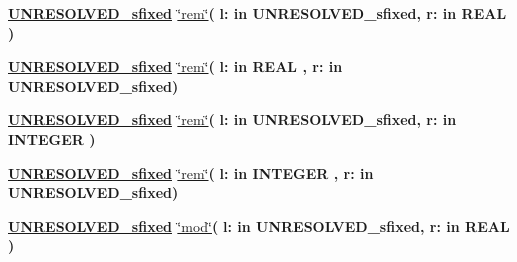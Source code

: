\begin{DoxyCompactItemize}
\item 
{\bfseries {\bfseries {\bfseries \hyperlink{classfixed__pkg_aa723b28a027c3c0f9bca02d75e8df4d6}{U\+N\+R\+E\+S\+O\+L\+V\+E\+D\+\_\+sfixed}} \textcolor{vhdlchar}{ }}} \hyperlink{classfixed__pkg_ac069740ccb193c395e563f253d734127}{\char`\"{}rem\char`\"{}}{\bfseries  ( }{\bfseries \textcolor{vhdlchar}{l\+: }\textcolor{stringliteral}{in }\textcolor{vhdlchar}{U\+N\+R\+E\+S\+O\+L\+V\+E\+D\+\_\+sfixed}}{\bfseries  , \textcolor{vhdlchar}{r\+: }\textcolor{stringliteral}{in }{\bfseries \textcolor{comment}{R\+E\+A\+L}\textcolor{vhdlchar}{ }}}{\bfseries  )} 
\item 
{\bfseries {\bfseries {\bfseries \hyperlink{classfixed__pkg_aa723b28a027c3c0f9bca02d75e8df4d6}{U\+N\+R\+E\+S\+O\+L\+V\+E\+D\+\_\+sfixed}} \textcolor{vhdlchar}{ }}} \hyperlink{classfixed__pkg_ac069740ccb193c395e563f253d734127}{\char`\"{}rem\char`\"{}}{\bfseries  ( }{\bfseries \textcolor{vhdlchar}{l\+: }\textcolor{stringliteral}{in }{\bfseries \textcolor{comment}{R\+E\+A\+L}\textcolor{vhdlchar}{ }}}{\bfseries  , \textcolor{vhdlchar}{r\+: }\textcolor{stringliteral}{in }\textcolor{vhdlchar}{U\+N\+R\+E\+S\+O\+L\+V\+E\+D\+\_\+sfixed}}{\bfseries  )} 
\item 
{\bfseries {\bfseries {\bfseries \hyperlink{classfixed__pkg_aa723b28a027c3c0f9bca02d75e8df4d6}{U\+N\+R\+E\+S\+O\+L\+V\+E\+D\+\_\+sfixed}} \textcolor{vhdlchar}{ }}} \hyperlink{classfixed__pkg_ac069740ccb193c395e563f253d734127}{\char`\"{}rem\char`\"{}}{\bfseries  ( }{\bfseries \textcolor{vhdlchar}{l\+: }\textcolor{stringliteral}{in }\textcolor{vhdlchar}{U\+N\+R\+E\+S\+O\+L\+V\+E\+D\+\_\+sfixed}}{\bfseries  , \textcolor{vhdlchar}{r\+: }\textcolor{stringliteral}{in }{\bfseries \textcolor{comment}{I\+N\+T\+E\+G\+E\+R}\textcolor{vhdlchar}{ }}}{\bfseries  )} 
\item 
{\bfseries {\bfseries {\bfseries \hyperlink{classfixed__pkg_aa723b28a027c3c0f9bca02d75e8df4d6}{U\+N\+R\+E\+S\+O\+L\+V\+E\+D\+\_\+sfixed}} \textcolor{vhdlchar}{ }}} \hyperlink{classfixed__pkg_ac069740ccb193c395e563f253d734127}{\char`\"{}rem\char`\"{}}{\bfseries  ( }{\bfseries \textcolor{vhdlchar}{l\+: }\textcolor{stringliteral}{in }{\bfseries \textcolor{comment}{I\+N\+T\+E\+G\+E\+R}\textcolor{vhdlchar}{ }}}{\bfseries  , \textcolor{vhdlchar}{r\+: }\textcolor{stringliteral}{in }\textcolor{vhdlchar}{U\+N\+R\+E\+S\+O\+L\+V\+E\+D\+\_\+sfixed}}{\bfseries  )} 
\item 
{\bfseries {\bfseries {\bfseries \hyperlink{classfixed__pkg_aa723b28a027c3c0f9bca02d75e8df4d6}{U\+N\+R\+E\+S\+O\+L\+V\+E\+D\+\_\+sfixed}} \textcolor{vhdlchar}{ }}} \hyperlink{classfixed__pkg_a3ef5d5f2634d904601d29ae5c41d2f9e}{\char`\"{}mod\char`\"{}}{\bfseries  ( }{\bfseries \textcolor{vhdlchar}{l\+: }\textcolor{stringliteral}{in }\textcolor{vhdlchar}{U\+N\+R\+E\+S\+O\+L\+V\+E\+D\+\_\+sfixed}}{\bfseries  , \textcolor{vhdlchar}{r\+: }\textcolor{stringliteral}{in }{\bfseries \textcolor{comment}{R\+E\+A\+L}\textcolor{vhdlchar}{ }}}{\bfseries  )} 

\end{DoxyCompactItemize}
